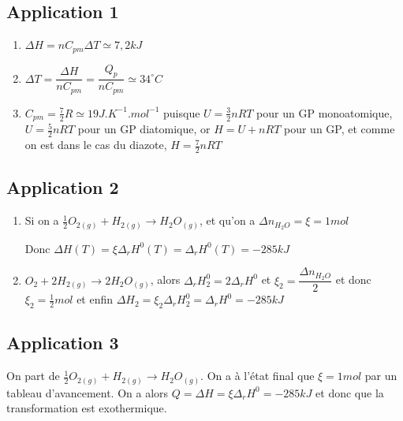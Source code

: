 \documentclass[a4paper,12pt]{book}
\begin{document}
\subsection{Application 1}
\begin{enumerate}
\item $\Delta H = nC_{pm}\Delta T \simeq 7,2kJ$
\item $\Delta T = \dfrac{\Delta H}{nC_{pm}}=\dfrac{Q_p}{nC_{pm}}\simeq 34^\circ C$
\item $C_{pm}=\frac{7}{2}R\simeq 19J.K^{-1}.mol^{-1}$ puisque $U=\frac{3}{2}nRT$ pour un GP monoatomique, $U=\frac{5}{2}nRT$ pour un GP diatomique, or $H=U+nRT$ pour un GP, et comme on est dans le cas du diazote, $H=\frac{7}{2}nRT$
\end{enumerate}

\subsection{Application 2}
\begin{enumerate}
\item Si on a $\frac{1}{2}O_{2(g)} + H_{2(g)}\rightarrow H_2O_{(g)}$, et qu'on a $\Delta n_{H_2O}=\xi=1 mol$ \par Donc $\Delta H(T) = \xi\Delta_rH^0(T)=\Delta_rH^0(T)=-285kJ$
\item $O_2+ 2H_{2(g)}\rightarrow 2H_2O_{(g)}$, alors $\Delta_rH^0_2=2\Delta_rH^0$ et $\xi_2=\dfrac{\Delta n_{H_2O}}{2}$ et donc $\xi_2 =\frac{1}{2}mol$ et enfin $\Delta H_2=\xi_2\Delta_rH^0_2=\Delta_rH^0=-285kJ$
\end{enumerate}

\subsection{Application 3}
On part de $\frac{1}{2}O_{2(g)} + H_{2(g)}\rightarrow H_2O_{(g)}$. On a à l'état final que $\xi= 1mol$ par un tableau d'avancement. On a alors $Q=\Delta H =\xi\Delta_rH^0=-285kJ$ et donc que la transformation est exothermique.
\end{document}
